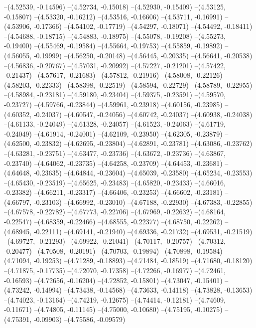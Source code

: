 --(4.52539, -0.14596)
--(4.52734, -0.15018)
--(4.52930, -0.15409)
--(4.53125, -0.15807)
--(4.53320, -0.16212)
--(4.53516, -0.16606)
--(4.53711, -0.16991)
--(4.53906, -0.17366)
--(4.54102, -0.17719)
--(4.54297, -0.18071)
--(4.54492, -0.18411)
--(4.54688, -0.18715)
--(4.54883, -0.18975)
--(4.55078, -0.19208)
--(4.55273, -0.19400)
--(4.55469, -0.19584)
--(4.55664, -0.19753)
--(4.55859, -0.19892)
--(4.56055, -0.19999)
--(4.56250, -0.20148)
--(4.56445, -0.20335)
--(4.56641, -0.20538)
--(4.56836, -0.20767)
--(4.57031, -0.20992)
--(4.57227, -0.21201)
--(4.57422, -0.21437)
--(4.57617, -0.21683)
--(4.57812, -0.21916)
--(4.58008, -0.22126)
--(4.58203, -0.22333)
--(4.58398, -0.22519)
--(4.58594, -0.22729)
--(4.58789, -0.22955)
--(4.58984, -0.23181)
--(4.59180, -0.23404)
--(4.59375, -0.23591)
--(4.59570, -0.23727)
--(4.59766, -0.23844)
--(4.59961, -0.23918)
--(4.60156, -0.23985)
--(4.60352, -0.24037)
--(4.60547, -0.24056)
--(4.60742, -0.24037)
--(4.60938, -0.24038)
--(4.61133, -0.24049)
--(4.61328, -0.24057)
--(4.61523, -0.24063)
--(4.61719, -0.24049)
--(4.61914, -0.24001)
--(4.62109, -0.23950)
--(4.62305, -0.23879)
--(4.62500, -0.23832)
--(4.62695, -0.23804)
--(4.62891, -0.23781)
--(4.63086, -0.23762)
--(4.63281, -0.23751)
--(4.63477, -0.23736)
--(4.63672, -0.23736)
--(4.63867, -0.23740)
--(4.64062, -0.23735)
--(4.64258, -0.23709)
--(4.64453, -0.23681)
--(4.64648, -0.23635)
--(4.64844, -0.23604)
--(4.65039, -0.23580)
--(4.65234, -0.23553)
--(4.65430, -0.23519)
--(4.65625, -0.23483)
--(4.65820, -0.23433)
--(4.66016, -0.23382)
--(4.66211, -0.23317)
--(4.66406, -0.23253)
--(4.66602, -0.23181)
--(4.66797, -0.23103)
--(4.66992, -0.23010)
--(4.67188, -0.22930)
--(4.67383, -0.22855)
--(4.67578, -0.22782)
--(4.67773, -0.22706)
--(4.67969, -0.22632)
--(4.68164, -0.22547)
--(4.68359, -0.22466)
--(4.68555, -0.22377)
--(4.68750, -0.22262)
--(4.68945, -0.22111)
--(4.69141, -0.21940)
--(4.69336, -0.21732)
--(4.69531, -0.21519)
--(4.69727, -0.21293)
--(4.69922, -0.21041)
--(4.70117, -0.20757)
--(4.70312, -0.20477)
--(4.70508, -0.20191)
--(4.70703, -0.19894)
--(4.70898, -0.19584)
--(4.71094, -0.19253)
--(4.71289, -0.18893)
--(4.71484, -0.18519)
--(4.71680, -0.18120)
--(4.71875, -0.17735)
--(4.72070, -0.17358)
--(4.72266, -0.16977)
--(4.72461, -0.16593)
--(4.72656, -0.16204)
--(4.72852, -0.15801)
--(4.73047, -0.15401)
--(4.73242, -0.14994)
--(4.73438, -0.14568)
--(4.73633, -0.14118)
--(4.73828, -0.13653)
--(4.74023, -0.13164)
--(4.74219, -0.12675)
--(4.74414, -0.12181)
--(4.74609, -0.11671)
--(4.74805, -0.11145)
--(4.75000, -0.10680)
--(4.75195, -0.10275)
--(4.75391, -0.09903)
--(4.75586, -0.09579)
